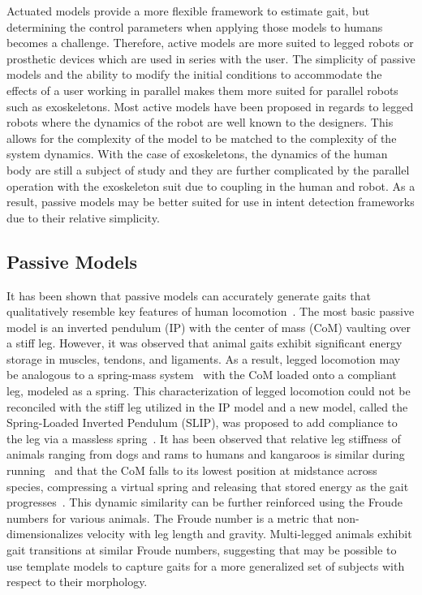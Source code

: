 Actuated models provide a more flexible framework to estimate gait, but determining the control parameters when applying those models to humans becomes a challenge. Therefore, active models are more suited to legged robots or prosthetic devices which are used in series with the user. The simplicity of passive models and the ability to modify the initial conditions to accommodate the effects of a user working in parallel makes them more suited for parallel robots such as exoskeletons. Most active models have been proposed in regards to legged robots where the dynamics of the robot are well known to the designers. This allows for the complexity of the model to be matched to the complexity of the system dynamics. With the case of exoskeletons, the dynamics of the human body are still a subject of study and they are further complicated by the parallel operation with the exoskeleton suit due to coupling in the human and robot. As a result, passive models may be better suited for use in intent detection frameworks due to their relative simplicity.

\subsection{Passive Models}

It has been shown that passive models can accurately generate gaits that qualitatively resemble key features of human locomotion~\cite{mochon1980ballistic}. The most basic passive model is an inverted pendulum (IP) with the center of mass (CoM) vaulting over a stiff leg. However, it was observed that animal gaits exhibit significant energy storage in muscles, tendons, and ligaments. As a result, legged locomotion may be analogous to a spring-mass system~\cite{blickhan1989spring} with the CoM loaded onto a compliant leg, modeled as a spring. This characterization of legged locomotion could not be reconciled with the stiff leg utilized in the IP model and a new model, called the Spring-Loaded Inverted Pendulum (SLIP), was proposed to add compliance to the leg via a massless spring~\cite{blickhan1989spring}. It has been observed that relative leg stiffness of animals ranging from dogs and rams to humans and kangaroos is similar during running~\cite{blickhan1993similarity} and that the CoM falls to its lowest position at midstance across species, compressing a virtual spring and releasing that stored energy as the gait progresses~\cite{full1999templates}. This dynamic similarity can be further reinforced using the Froude numbers for various animals. The Froude number is a metric that non-dimensionalizes velocity with leg length and gravity. Multi-legged animals exhibit gait transitions at similar Froude numbers, suggesting that may be possible to use template models to capture gaits for a more generalized set of subjects with respect to their morphology.

